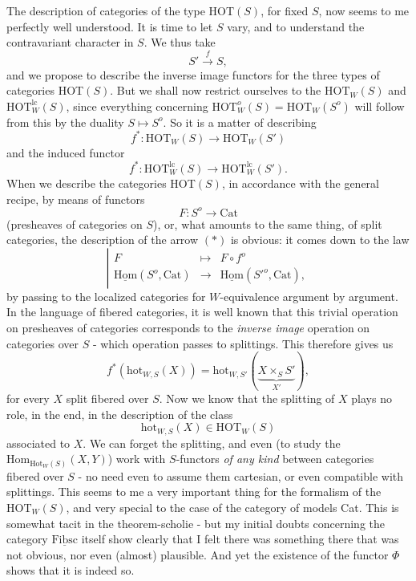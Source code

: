 \documentclass[11pt]{article}
\newcommand{\printedpage}[1]{\marginpar{\footnotesize p.~#1}}
\newcommand{\msp}[1]{\marginpar{\footnotesize [#1]}}
\newcommand{\Hom}{\mathrm{Hom}}
\newcommand{\HOT}{\mathrm{HOT}}
\newcommand{\hot}{\mathrm{hot}}
\newcommand{\Cat}{\mathrm{Cat}}
\begin{document}
The description of categories of the type HOT$(S)$, for fixed $S$, now seems to me perfectly well understood. It is time to let $S$ vary, and to understand the contravariant character in $S$. We thus take
\[S' \xrightarrow{f} S,\]
and we propose to describe the inverse image functors for the three types of categories HOT$(S)$. But we shall now restrict ourselves to the $\HOT_W(S)$ and $\HOT^{\mathrm{lc}}_W(S)$, since everything concerning $\HOT^o_W(S) = \HOT_W(S^o)$ will follow from this by the duality $S \longmapsto S^o$. So it is a matter of describing
\msp{page 116}
\[f^* : \HOT_W(S) \longrightarrow \HOT_W(S') \tag*{$(*)$}\]
and the induced functor
\[f^* : \HOT^{\mathrm{lc}}_W(S) \longrightarrow \HOT^{\mathrm{lc}}_W(S').\]
When we describe the categories HOT$(S)$, in accordance with the general recipe, by means of functors
\[F : S^o \longrightarrow \Cat\]
(presheaves of categories on $S$), or, what amounts to the same thing, of split categories, the description of the arrow $(*)$ is obvious: it comes down to the law
\[\left|\begin{array}{rcl}
F & \longmapsto & F \circ f^o \\[1ex]
\underline{\mathrm{Hom}}(S^o, \Cat) & \longrightarrow & \underline{\mathrm{Hom}}(S'^o, \Cat),
\end{array}\right.\]
by passing to the localized categories for $W$-equivalence argument by argument. In the language of fibered categories, it is well known that this trivial operation on presheaves of categories corresponds to the \textit{inverse image} operation on categories over $S$ - which operation passes to splittings. This therefore gives us
\[f^*(\hot_{W,S}(X)) = \hot_{W,S'}(\underbrace{X \times_S S'}_{X'}),\]
for every $X$ split fibered over $S$. Now we know that the splitting of $X$ plays no role, in the end, in the description of the class
\[\hot_{W,S}(X) \in \HOT_W(S)\]
\printedpage{73}
\msp{page 117}
associated to $X$. We can forget the splitting, and even (to study the $\Hom_{\mathrm{Hot}_W(S)}(X, Y)$) work with $S$-functors \textit{of any kind} between categories fibered over $S$ - no need even to assume them cartesian, or even compatible with splittings. This seems to me a very important thing for the formalism of the $\HOT_W(S)$, and very special to the case of the category of models Cat. This is somewhat tacit in the theorem-scholie - but my initial doubts concerning the category $\underline{\mathrm{Fibsc}}$ itself show clearly that I felt there was something there that was not obvious, nor even (almost) plausible. And yet the existence of the functor $\Phi$ shows that it is indeed so.
\end{document}
